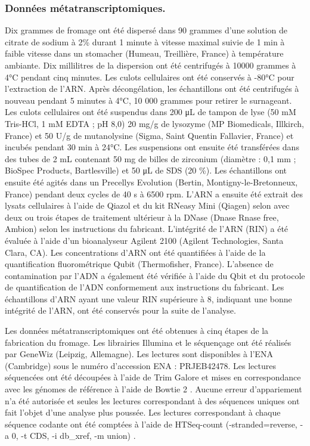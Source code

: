 \documentclass[../main.tex]{subfiles}
\begin{document}
\subsubsection{Données métatranscriptomiques.} Dix grammes de fromage ont été dispersé dans 90 grammes d'une solution de citrate de sodium à 2\% durant 1 minute à vitesse maximal suivie de 1 min à faible vitesse dans un stomacher (Humeau, Treillière, France) à température ambiante. Dix millilitres de la dispersion ont été centrifugés à 10000 grammes à 4\unit{\degreeCelsius} pendant cinq minutes. Les culots cellulaires ont été conservés à -80\unit{\degreeCelsius} pour l'extraction de l'ARN. Après décongélation, les échantillons ont été centrifugés à nouveau pendant 5 minutes à 4\unit{\degreeCelsius}, 10 000 grammes pour retirer le surnageant. Les culots cellulaires ont été suspendus dans 200 μL de tampon de lyse (50 mM Tris-HCl, 1 mM EDTA ; pH 8,0) 20 mg/g de lysozyme (MP Biomedicals, Illkirch, France) et 50 U/g de mutanolysine (Sigma, Saint Quentin Fallavier, France) et incubés pendant 30 min à 24\unit{\degreeCelsius}. Les suspensions ont ensuite été transférées dans des tubes de 2 mL contenant 50 mg de billes de zirconium (diamètre : 0,1 mm ; BioSpec Products, Bartlesville) et 50 μL de SDS (20 \%). Les échantillons ont ensuite été agités dans un Precellys Evolution (Bertin, Montigny-le-Bretonneux, France) pendant deux cycles de 40 s à 6500 rpm. L'ARN a ensuite été extrait des lysats cellulaires à l'aide de Qiazol et du kit RNeasy Mini (Qiagen) selon \citep{Falentin.2010} avec deux ou trois étapes de traitement ultérieur à la DNase (Dnase Rnase free, Ambion) selon les instructions du fabricant. L'intégrité de l'ARN (RIN) a été évaluée à l'aide d'un bioanalyseur Agilent 2100 (Agilent Technologies, Santa Clara, CA). Les concentrations d'ARN ont été quantifiées à l'aide de la quantification fluorométrique Qubit (Thermofisher, France). L'absence de contamination par l'ADN a également été vérifiée à l'aide du Qbit et du protocole de quantification de l'ADN conformement aux instructions du fabricant. 
Les échantillons d'ARN ayant une valeur RIN supérieure à 8, indiquant une bonne intégrité de l'ARN, ont été conservés pour la suite de l'analyse.

Les données métatranscriptomiques ont été obtenues à cinq étapes de la fabrication du fromage. Les librairies Illumina et le séquençage ont été réalisés par GeneWiz (Leipzig, Allemagne). Les lectures sont disponibles à l'ENA (Cambridge) sous le numéro d'accession ENA : PRJEB42478. Les lectures séquencées ont été découpées à l'aide de Trim Galore et mises en correspondance avec les génomes de référence à l'aide de Bowtie 2 \citep{Langmead.2009}. Aucune erreur d'appariement n'a été autorisée et seules les lectures correspondant à des séquences uniques ont fait l'objet d'une analyse plus poussée. Les lectures correspondant à chaque séquence codante ont été comptées à l'aide de HTSeq-count (-stranded=reverse, -a 0, -t CDS, -i db\_xref, -m union) \citep{Putri.2022}.
\end{document}
